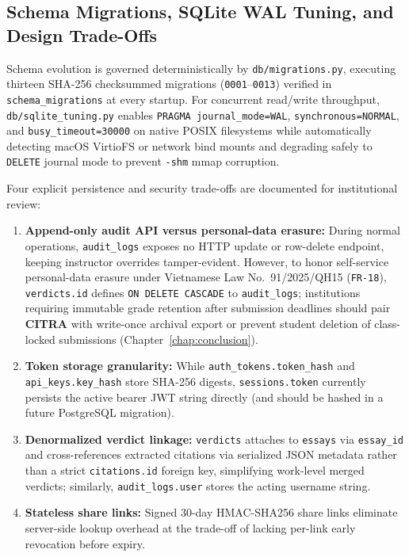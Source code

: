 \subsection{Schema Migrations, SQLite WAL Tuning, and Design Trade-Offs}

Schema evolution is governed deterministically by \texttt{db/migrations.py}, executing thirteen SHA-256 checksummed migrations (\texttt{0001}--\texttt{0013}) verified in \texttt{schema\_migrations} at every startup. For concurrent read/write throughput, \texttt{db/sqlite\_tuning.py} enables \texttt{PRAGMA journal\_mode=WAL}, \texttt{synchronous=NORMAL}, and \texttt{busy\_timeout=30000} on native POSIX filesystems while automatically detecting macOS VirtioFS or network bind mounts and degrading safely to \texttt{DELETE} journal mode to prevent \texttt{-shm} mmap corruption.

Four explicit persistence and security trade-offs are documented for institutional review:
\begin{enumerate}
    \item \textbf{Append-only audit API versus personal-data erasure:} During normal operations, \texttt{audit\_logs} exposes no HTTP update or row-delete endpoint, keeping instructor overrides tamper-evident. However, to honor self-service personal-data erasure under Vietnamese Law No.\ 91/2025/QH15 (\texttt{FR-18}), \texttt{verdicts.id} defines \texttt{ON DELETE CASCADE} to \texttt{audit\_logs}; institutions requiring immutable grade retention after submission deadlines should pair \textbf{CITRA} with write-once archival export or prevent student deletion of class-locked submissions (Chapter~\ref{chap:conclusion}).
    \item \textbf{Token storage granularity:} While \texttt{auth\_tokens.token\_hash} and \texttt{api\_keys.key\_hash} store SHA-256 digests, \texttt{sessions.token} currently persists the active bearer JWT string directly (and should be hashed in a future PostgreSQL migration).
    \item \textbf{Denormalized verdict linkage:} \texttt{verdicts} attaches to \texttt{essays} via \texttt{essay\_id} and cross-references extracted citations via serialized JSON metadata rather than a strict \texttt{citations.id} foreign key, simplifying work-level merged verdicts; similarly, \texttt{audit\_logs.user} stores the acting username string.
    \item \textbf{Stateless share links:} Signed 30-day HMAC-SHA256 share links eliminate server-side lookup overhead at the trade-off of lacking per-link early revocation before expiry.
\end{enumerate}

